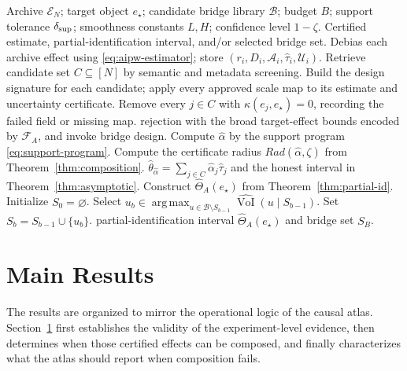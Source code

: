 \documentclass[11pt]{article}
\numberwithin{equation}{section}
\DeclareMathOperator*{\argmax}{arg\,max}
\newcommand{\1}{\mathbf 1}
\newcommand{\cA}{\mathcal A}
\newcommand{\cB}{\mathcal B}
\newcommand{\cE}{\mathcal E}
\newcommand{\cF}{\mathcal F}
\newcommand{\cU}{\mathcal U}
\begin{document}
\begin{algorithm}[H]
\caption{Rejectable Causal Atlas and Greedy Bridge Design}
\label{alg:atlas}
\begin{algorithmic}[1]
\Require Archive \(\cE_N\); target object \(e_\star\); candidate bridge library \(\cB\); budget \(B\); support tolerance \(\delta_{\rm sup}\); smoothness constants \(L,H\); confidence level \(1-\zeta\).
\Ensure Certified estimate, partial-identification interval, and/or selected bridge set.
\State Debias each archive effect using \eqref{eq:aipw-estimator}; store \((r_i,D_i,\cA_i,\widehat\tau_i,\cU_i)\).
\State Retrieve candidate set \(C\subseteq[N]\) by semantic and metadata screening.
\State Build the design signature for each candidate; apply every approved scale map to its estimate and uncertainty certificate.
\State Remove every \(j\in C\) with \(\kappa(e_j,e_\star)=0\), recording the failed field or missing map.
  \State \Return rejection with the broad target-effect bounds encoded by \(\cF_A\), and invoke bridge design.
\EndIf
\State Compute \(\widehat\alpha\) by the support program \eqref{eq:support-program}.
\State Compute the certificate radius \(Rad(\widehat\alpha,\zeta)\) from Theorem~\ref{thm:composition}.
  \State \Return \(\widehat\theta_{\widehat\alpha}=\sum_{j\in C}\widehat\alpha_j\widehat\tau_j\) and the honest interval in Theorem~\ref{thm:asymptotic}.
\Else
  \State Construct \(\widehat\Theta_A(e_\star)\) from Theorem~\ref{thm:partial-id}.
  \State Initialize \(S_0=\varnothing\).
    \State Select \(u_b\in\argmax_{u\in\cB\setminus S_{b-1}}\widehat{\operatorname{VoI}}(u\mid S_{b-1})\).
    \State Set \(S_b=S_{b-1}\cup\{u_b\}\).
  \EndFor
  \State \Return partial-identification interval \(\widehat\Theta_A(e_\star)\) and bridge set \(S_B\).
\EndIf
\end{algorithmic}
\end{algorithm}

\section{Main Results}
\label{sec:theory}

The results are organized to mirror the operational logic of the causal atlas.  Section~\ref{sec:theory} first establishes the validity of the experiment-level evidence, then determines when those certified effects can be composed, and finally characterizes what the atlas should report when composition fails.
\end{document}
